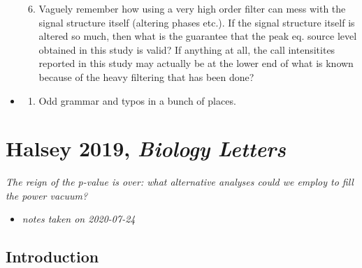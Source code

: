 \documentclass[
]{book}
\providecommand{\tightlist}{%
  \setlength{\itemsep}{0pt}\setlength{\parskip}{0pt}}
\begin{document}
\begin{itemize}
\begin{enumerate}
  \setcounter{enumi}{5}
  \tightlist
  \item
    Vaguely remember how using a very high order filter can mess with the signal structure itself (altering phases etc.). If the signal structure itself is altered so much, then what is the guarantee that the peak eq. source level obtained in this study is valid? If anything at all, the call intensitites reported in this study may actually be at the lower end of what is known because of the heavy filtering that has been done?
  \end{enumerate}
\item
  \begin{enumerate}
  \def\labelenumi{\arabic{enumi}.}
  \setcounter{enumi}{6}
  \tightlist
  \item
    Odd grammar and typos in a bunch of places.
  \end{enumerate}
\end{itemize}

\hypertarget{halsey-2019-biology-letters}{%
\chapter{\texorpdfstring{Halsey 2019, \emph{Biology Letters}}{Halsey 2019, Biology Letters}}\label{halsey-2019-biology-letters}}


\emph{The reign of the p-value is over: what alternative analyses could we employ to fill the power vacuum?} \citep{halsey2019a}

\begin{itemize}
\tightlist
\item
  \emph{notes taken on 2020-07-24}
\end{itemize}

\hypertarget{introduction-5}{%
\section{Introduction}\label{introduction-5}}
\end{document}
